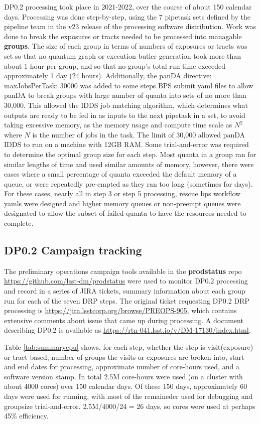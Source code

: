 \documentclass[OPS,authoryear,toc]{lsstdoc}
\begin{document}
DP0.2 processing took place in 2021-2022, over the course of about 150
calendar days.  Processing was done step-by-step, using the 7 pipetask
sets defined by the pipeline team in the v23 release of the processing
software distribution.  Work was done to break the exposures or tracts
needed to be processed into managable {\bf groups}.  The size of each
group in terms of numbers of exposures or tracts was set so that no
quantum graph or execution butler generation took more than about 1
hour per group, and so that no group's total run time exceeded
approximately 1 day (24 hours).  Additionally, the panDA directive:
{\rm maxJobsPerTask: 30000} was added to some steps BPS submit yaml
files to allow panDA to break groups with large number of quanta into
sets of no more than 30,000.  This allowed the IDDS job matching
algorithm, which determines what outputs are ready to be fed in as
inputs to the next pipetask in a set, to avoid taking excessive
memory, as the memory usage and compute time scale as $N^2$ where $N$
is the number of jobs in the task.  The limit of 30,000 allowed panDA
IDDS to run on a machine with 12GB RAM.  Some trial-and-error was
required to determine the optimal group size for each step.  Most
quanta in a group ran for similar lengths of time and used similar
amounts of memory, however, there were cases where a small percentage
of quanta exceeded the default memory of a queue, or were repeatedly
pre-empted as they ran too long (sometimes for days).  For these
cases, nearly all in step 3 or step 5 processing, rescue bps workflow
yamls were designed and higher memory queues or non-preempt queues
were designated to allow the subset of failed quanta to have the
resources needed to complete.

\subsection{DP0.2 Campaign tracking}
The preliminary operations campaign tools available in the {\bf
  prodstatus} repo \url{https://github.com/lsst-dm/prodstatus} were
used to monitor DP0.2 processing and record in a series of JIRA
tickets, summary information about each group run for each of the
seven DRP steps.   The original ticket requesting DP0.2 DRP processing is \url{
  https://jira.lsstcorp.org/browse/PREOPS-905}, which contains extensive comments about issue that came up during processing. A document describing DP0.2 is available as \url{https://rtn-041.lsst.io/v/DM-17130/index.html}.

Table \ref{tab:summarycpu} shows, for each step, whether the step is
visit(exposure) or tract based, number of groups the visits or
exposures are broken into, start and end dates for processing,
approximate number of core-hours used, and a software version
stamp. In total 2.5M core-hours were used (on a cluster with about
4000 cores) over 150 calendar days.  Of these 150 days, approximately
60 days were used for running, with most of the remaineder used for
debugging and groupsize trial-and-error.  2.5M/4000/24 = 26 days, so
cores were used at perhaps 45\% efficiency.
\end{document}

